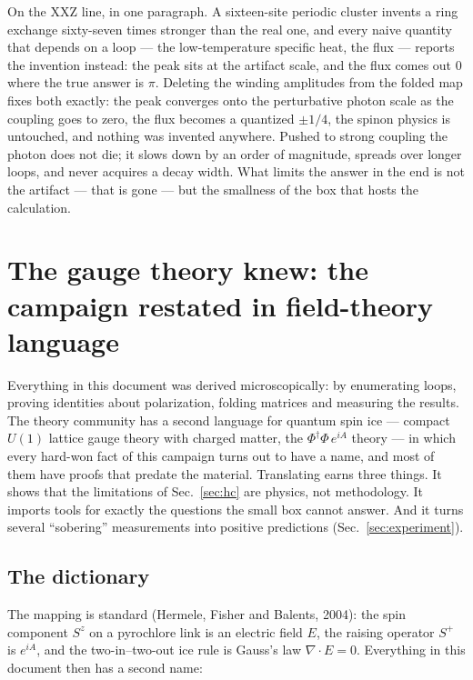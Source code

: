 \documentclass[11pt,a4paper]{article}
\begin{document}
\begin{plainwords}
On the XXZ line, in one paragraph.  A sixteen-site periodic cluster invents
a ring exchange sixty-seven times stronger than the real one, and every
naive quantity that depends on a loop --- the low-temperature specific heat,
the flux --- reports the invention instead: the peak sits at the artifact
scale, and the flux comes out $0$ where the true answer is $\pi$.  Deleting
the winding amplitudes from the folded map fixes both exactly: the peak
converges onto the perturbative photon scale as the coupling goes to zero,
the flux becomes a quantized $\pm1/4$, the spinon physics is untouched, and
nothing was invented anywhere.  Pushed to strong coupling the photon does
not die; it slows down by an order of magnitude, spreads over longer loops,
and never acquires a decay width.  What limits the answer in the end is not
the artifact --- that is gone --- but the smallness of the box that hosts
the calculation.
\end{plainwords}

\section{The gauge theory knew: the campaign restated in field-theory
language}
\label{sec:gauge}

Everything in this document was derived microscopically: by enumerating
loops, proving identities about polarization, folding matrices and measuring
the results.  The theory community has a second language for quantum spin
ice --- compact $U(1)$ lattice gauge theory with charged matter, the
$\Phi^\dagger\Phi\,e^{iA}$ theory --- in which every hard-won fact of this
campaign turns out to have a name, and most of them have proofs that predate
the material.  Translating earns three things.  It shows that the
limitations of Sec.~\ref{sec:hc} are physics, not methodology.  It imports
tools for exactly the questions the small box cannot answer.  And it turns
several ``sobering'' measurements into positive predictions
(Sec.~\ref{sec:experiment}).

\subsection{The dictionary}
\label{sec:dictionary}

The mapping is standard (Hermele, Fisher and Balents, 2004): the spin
component $S^z$ on a pyrochlore link is an electric field $E$, the raising
operator $S^+$ is $e^{iA}$, and the two-in--two-out ice rule is Gauss's law
$\nabla\!\cdot\!E=0$.  Everything in this document then has a second name:
\end{document}
